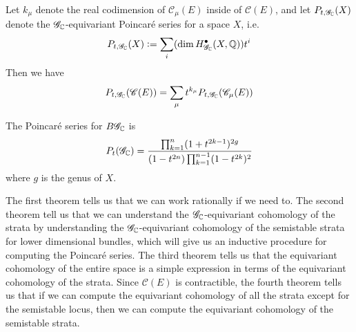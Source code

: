 %
\begin{thm}
Let $k_\mu$ denote the real codimension of $\mathscr{C}_\mu(E)$ inside
of $\mathscr{C}(E)$, and let $P_{t,\mathscr{G}_{\mathbb{C}}}(X)$ denote the
$\mathscr{G}_{\mathbb{C}}$-equivariant Poincar\'e series for a space $X$, i.e.
\[
P_{t,\mathscr{G}_{\mathbb{C}}}(X) \vcentcolon= \sum_i (\dim H^\bullet_{\mathscr{G}_{\mathbb{C}}}(X,\mathbb{Q}))t^i
\]
Then we have
\[
P_{t,\mathscr{G}_{\mathbb{C}}}(\mathscr{C}(E))
= \sum_\mu t^{k_\mu}P_{t,\mathscr{G}_{\mathbb{C}}}(\mathscr{C}_\mu(E))
\]
\end{thm}
%
\begin{thm}
The Poincar\'e series for $B\mathscr{G}_{\mathbb{C}}$ is
\[
P_t(\mathscr{G}_{\mathbb{C}}) = \frac{\prod^n_{k=1}(1+t^{2k-1})^{2g}}
{(1-t^{2n})\prod_{k=1}^{n-1}(1-t^{2k})^2}
\]
where $g$ is the genus of $X$.
\end{thm}
%
The first theorem tells us that we can work rationally if we need to.
The second theorem tell us that we can understand the $\mathscr{G}_{\mathbb{C}}$-equivariant
cohomology of the strata by understanding the $\mathscr{G}_{\mathbb{C}}$-equivariant
cohomology of the semistable strata for lower dimensional bundles,
which will give us an inductive procedure for computing the Poincar\'e series.
The third theorem tells us that the equivariant cohomology of
the entire space is a simple expression in terms of the equivariant cohomology
of the strata. Since $\mathscr{C}(E)$ is contractible, the fourth
theorem tells us that if we can compute the equivariant cohomology of
all the strata except for the semistable locus, then we can compute the
equivariant cohomology of the semistable strata. \\

